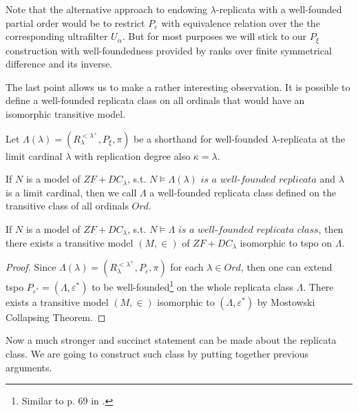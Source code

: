 Note that the alternative approach to endowing $\lambda$-replicata with a well-founded partial order would be to restrict $P_{\varepsilon}$ with equivalence relation over the the corresponding ultrafilter $U_\alpha$. But for most purposes we will stick to our $P_{\xi}$ construction with well-foundedness provided by ranks over finite symmetrical difference and its inverse.

The last point allows us to make a rather interesting observation. It is possible to define a well-founded replicata class on all ordinals that would have an isomorphic transitive model.

\begin{definition}\label{def_wf_rep_limcard}
    Let $\Lambda(\lambda) = (R^{<\lambda^+}_\lambda, P_{\xi}, \pi)$ be a shorthand for well-founded $\lambda$-replicata at the limit cardinal $\lambda$ with replication degree also $\kappa = \lambda$.
\end{definition}

\begin{definition}\label{def_wf_rep_class}
    If $N$ is a model of $ZF+DC_\lambda$, s.t. $N \models \Lambda(\lambda) \textit{ is a well-founded replicata}$ and $\lambda$ is a limit cardinal, then we call $\Lambda$ a well-founded replicata class defined on the transitive class of all ordinals $Ord$.
\end{definition}


\begin{lemma}\label{lemma_mostowski_col_rep}
    If $N$ is a model of $ZF+DC_\lambda$, s.t. $N \models \Lambda \textit{ is a well-founded replicata class}$, then there exists a transitive model $(M, \in)$ of $ZF+DC_\lambda$ isomorphic to tspo on $\Lambda$.
\end{lemma}
\begin{proof}
    Since $\Lambda(\lambda) = (R^{<\lambda^+}_\lambda, P_{\varepsilon}, \pi)$ for each $\lambda \in Ord$, then one can extend tspo $P_{\varepsilon^\ast} = (\Lambda, \varepsilon^\ast)$ to be well-founded\footnote{Similar to p. 69 in \cite{jech2003set}.} on the whole replicata class $\Lambda$. There exists a transitive model $(M, \in)$ isomorphic to $(\Lambda, \varepsilon^\ast)$ by Mostowski Collapsing Theorem.
\end{proof}

Now a much stronger and succinct statement can be made about the replicata class. We are going to construct such class by putting together previous arguments.

